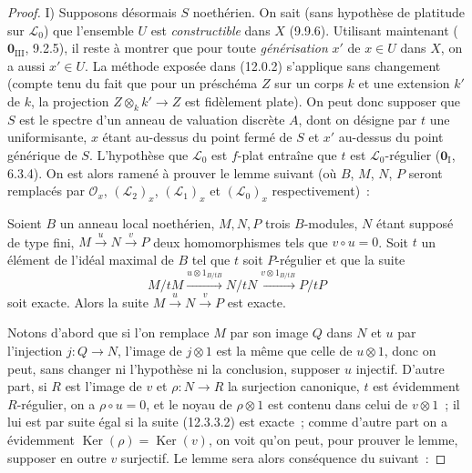 \begin{proof}
\medskip
I) Supposons désormais $S$ noethérien. On sait (sans hypothèse de platitude sur
$\mathcal L_0$) que l'ensemble $U$ est \emph{constructible} dans $X$ (9.9.6).
Utilisant maintenant ($\mathbf 0_{\mathrm{III}}$, 9.2.5), il reste à montrer
que pour toute \emph{générisation} $x'$ de $x\in U$ dans $X$, on a aussi
$x'\in U$. La méthode exposée dans (12.0.2) s'applique sans changement (compte
tenu du fait que pour un préschéma $Z$ sur un corps $k$ et une extension $k'$
de $k$, la projection $Z\otimes_k k'\to Z$ est fidèlement plate). On peut donc
supposer que $S$ est le spectre d'un anneau de valuation discrète $A$, dont on
désigne par $t$ une uniformisante, $x$ étant au-dessus du point fermé de $S$ et
$x'$ au-dessus du point générique de $S$. L'hypothèse que $\mathcal L_0$ est
$f$-plat entraîne que $t$ est $\mathcal L_0$-régulier
($\mathbf 0_{\mathrm I}$, 6.3.4). On est alors ramené à prouver le lemme suivant
(où $B$, $M$, $N$, $P$ seront remplacés par $\mathcal O_x$,
$(\mathcal L_2)_x$, $(\mathcal L_1)_x$ et $(\mathcal L_0)_x$ respectivement)~:

\begin{lemma}[12.3.3.1]
\label{IV.12.3.3.1-fr}
Soient $B$ un anneau local noethérien, $M,N,P$ trois $B$-modules, $N$ étant
supposé de type fini, $M\xrightarrow{u}N\xrightarrow{v}P$ deux homomorphismes
tels que $v\circ u=0$. Soit $t$ un élément de l'idéal maximal de $B$ tel que
$t$ soit $P$-régulier et que la suite
\begin{equation}
  \tag{12.3.3.2}
  \label{IV.12.3.3.2-fr}
  M/tM\xrightarrow{u\otimes1_{B/tB}}N/tN
  \xrightarrow{v\otimes1_{B/tB}}P/tP
\end{equation}
soit exacte. Alors la suite $M\xrightarrow{u}N\xrightarrow{v}P$ est exacte.
\end{lemma}

Notons d'abord que si l'on remplace $M$ par son image $Q$ dans $N$ et $u$ par
l'injection $j:Q\to N$, l'image de $j\otimes1$ est la même que celle de
$u\otimes1$, donc on peut, sans changer ni l'hypothèse ni la conclusion,
supposer $u$ injectif. D'autre part, si $R$ est l'image de $v$ et
$\rho:N\to R$ la surjection canonique, $t$ est évidemment $R$-régulier, on a
$\rho\circ u=0$, et le noyau de $\rho\otimes1$ est contenu dans celui de
$v\otimes1$~; il lui est par suite égal si la suite (12.3.3.2) est exacte~;
comme d'autre part on a évidemment $\operatorname{Ker}(\rho)
=\operatorname{Ker}(v)$,
on voit qu'on peut, pour prouver le lemme, supposer en
outre $v$ surjectif. Le lemme sera alors conséquence du suivant~:


\end{proof}
